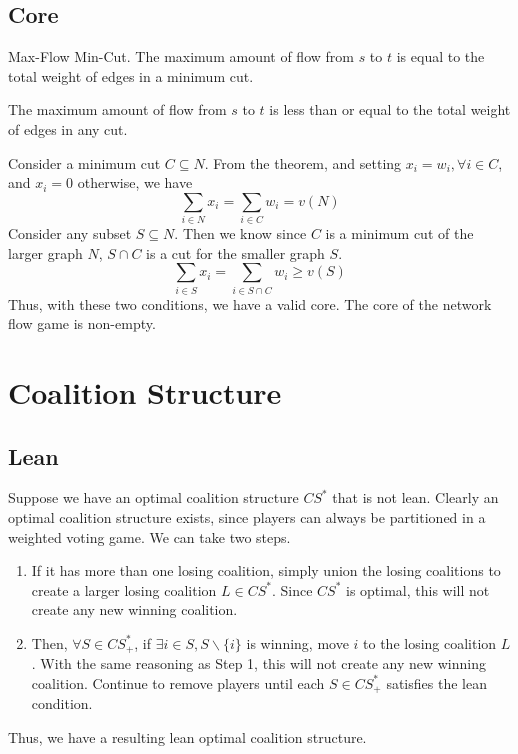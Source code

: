 \subsection{Core}

\begin{theorem}
    Max-Flow Min-Cut.
    The maximum amount of flow from $s$ to $t$ is equal to
    the total weight of edges in a minimum cut.
\end{theorem}
\begin{corollary}
    The maximum amount of flow from $s$ to $t$ is less than or equal to
    the total weight of edges in any cut.
\end{corollary}
Consider a minimum cut $C\subseteq N$.
From the theorem, and setting $x_i=w_i,\forall i\in C$, 
and $x_i=0$ otherwise, we have
\[\sum_{i\in N}x_i=\sum_{i\in C}w_i = v(N)\]
Consider any subset $S\subseteq N$.
Then we know since $C$ is a minimum cut of the larger graph $N$,
$S\cap C$ is a cut for the smaller graph $S$.
\[\sum_{i\in S}x_i = \sum_{i\in S\cap C}w_i \geq v(S)\]
Thus, with these two conditions, we have a valid core.
The core of the network flow game is non-empty.

\newpage
\section{Coalition Structure}

\subsection{Lean}
Suppose we have an optimal coalition structure $CS^*$ that is not lean.
Clearly an optimal coalition structure exists,
since players can always be partitioned in a weighted voting game.
We can take two steps.
\begin{enumerate}
    \item If it has more than one losing coalition, 
    simply union the losing coalitions 
    to create a larger losing coalition $L\in CS^*$.
    Since $CS^*$ is optimal, this will not create any new winning coalition.
    \item Then, $\forall S\in CS_+^*$, 
    if $\exists i\in S, S\backslash\{i\}$ is winning,
    move $i$ to the losing coalition $L$. 
    With the same reasoning as Step 1, 
    this will not create any new winning coalition.
    Continue to remove players until each $S\in CS_+^*$
    satisfies the lean condition.
\end{enumerate}
Thus, we have a resulting lean optimal coalition structure.

